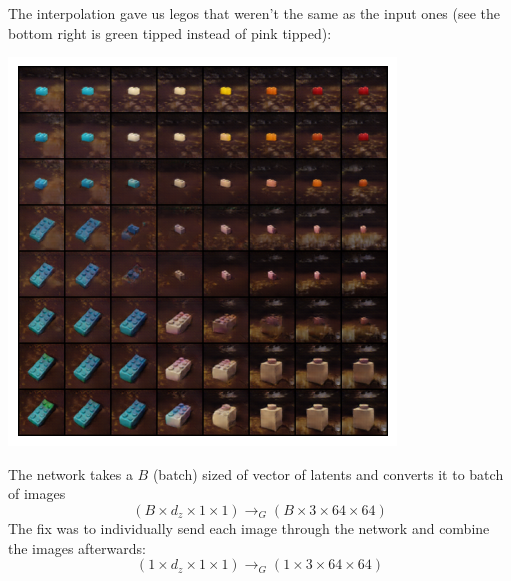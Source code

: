 \documentclass{article}
\begin{document}
\noindent The interpolation gave us legos that weren't the same as the input ones
(see the bottom right is green tipped instead of pink tipped):
\begin{center}
\includegraphics[scale=1]{seed_69,0,23,42,62_wrong}
\end{center}

The network takes a $B$ (batch) sized of vector of latents and
converts it to batch of images
$$
(B \times d_z \times 1 \times 1)
\rightarrow_{G}
(B \times 3 \times 64 \times 64)
$$
The fix was to individually send each image through the network and combine the images
afterwards: 
$$
(1 \times d_z \times 1 \times 1)
\rightarrow_{G}
(1 \times 3 \times 64 \times 64)
$$
\end{document}
